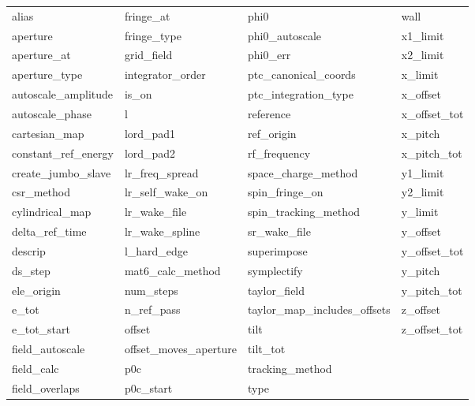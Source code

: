  \begin{tabular}{llll} \toprule
alias                       & fringe_at                   & phi0                        & wall                        \\
aperture                    & fringe_type                 & phi0_autoscale              & x1_limit                    \\
aperture_at                 & grid_field                  & phi0_err                    & x2_limit                    \\
aperture_type               & integrator_order            & ptc_canonical_coords        & x_limit                     \\
autoscale_amplitude         & is_on                       & ptc_integration_type        & x_offset                    \\
autoscale_phase             & l                           & reference                   & x_offset_tot                \\
cartesian_map               & lord_pad1                   & ref_origin                  & x_pitch                     \\
constant_ref_energy         & lord_pad2                   & rf_frequency                & x_pitch_tot                 \\
create_jumbo_slave          & lr_freq_spread              & space_charge_method         & y1_limit                    \\
csr_method                  & lr_self_wake_on             & spin_fringe_on              & y2_limit                    \\
cylindrical_map             & lr_wake_file                & spin_tracking_method        & y_limit                     \\
delta_ref_time              & lr_wake_spline              & sr_wake_file                & y_offset                    \\
descrip                     & l_hard_edge                 & superimpose                 & y_offset_tot                \\
ds_step                     & mat6_calc_method            & symplectify                 & y_pitch                     \\
ele_origin                  & num_steps                   & taylor_field                & y_pitch_tot                 \\
e_tot                       & n_ref_pass                  & taylor_map_includes_offsets & z_offset                    \\
e_tot_start                 & offset                      & tilt                        & z_offset_tot                \\
field_autoscale             & offset_moves_aperture       & tilt_tot                    &                             \\
field_calc                  & p0c                         & tracking_method             &                             \\
field_overlaps              & p0c_start                   & type                        &                             \\
 \bottomrule
 \end{tabular}
